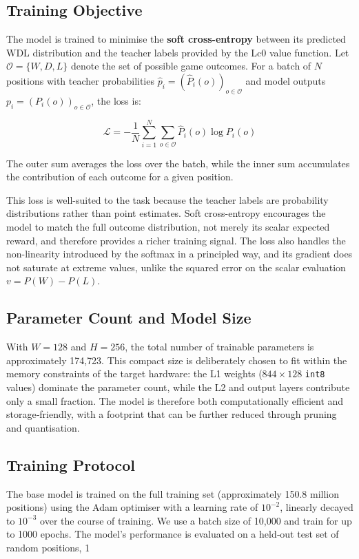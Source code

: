 \subsection{Training Objective}

The model is trained to minimise the \textbf{soft cross-entropy} between its predicted WDL distribution and the teacher labels provided by the Lc0 value function. Let $\mathcal{O} = \{W, D, L\}$ denote the set of possible game outcomes. For a batch of $N$ positions with teacher probabilities $\hat{p}_i = (\hat{P}_i(o))_{o \in \mathcal{O}}$ and model outputs $p_i = (P_i(o))_{o \in \mathcal{O}}$, the loss is:

\[
\mathcal{L} = -\frac{1}{N} \sum_{i=1}^N \sum_{o \in \mathcal{O}} \hat{P}_i(o) \log P_i(o)
\]

The outer sum averages the loss over the batch, while the inner sum accumulates the contribution of each outcome for a given position.

This loss is well-suited to the task because the teacher labels are probability distributions rather than point estimates. Soft cross-entropy encourages the model to match the full outcome distribution, not merely its scalar expected reward, and therefore provides a richer training signal. The loss also handles the non-linearity introduced by the softmax in a principled way, and its gradient does not saturate at extreme values, unlike the squared error on the scalar evaluation $v = P(W) - P(L)$.

\subsection{Parameter Count and Model Size}

With $W = 128$ and $H = 256$, the total number of trainable parameters is approximately 174{,}723. This compact size is deliberately chosen to fit within the memory constraints of the target hardware: the L1 weights ($844 \times 128$ \texttt{int8} values) dominate the parameter count, while the L2 and output layers contribute only a small fraction. The model is therefore both computationally efficient and storage‑friendly, with a footprint that can be further reduced through pruning and quantisation.

\subsection{Training Protocol}

The base model is trained on the full training set (approximately 150.8 million positions) using the Adam optimiser with a learning rate of $10^{-2}$, linearly decayed to $10^{-3}$ over the course of training. We use a batch size of 10{,}000 and train for up to 1000 epochs. The model's performance is evaluated on a held‑out test set of random positions, 1\\%



